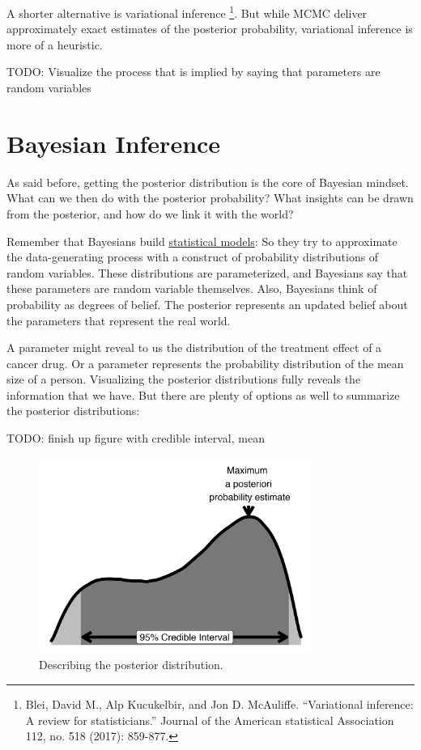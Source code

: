 \documentclass[
  10pt,
]{scrbook}
\begin{document}
A shorter alternative is variational inference \footnote{Blei, David M., Alp Kucukelbir, and Jon D. McAuliffe. ``Variational inference: A review for statisticians.'' Journal of the American statistical Association 112, no. 518 (2017): 859-877.}.
But while MCMC deliver approximately exact estimates of the posterior probability, variational inference is more of a heuristic.

TODO: Visualize the process that is implied by saying that parameters are random variables

\hypertarget{bayesian-inference}{%
\section{Bayesian Inference}\label{bayesian-inference}}

As said before, getting the posterior distribution is the core of Bayesian mindset.
What can we then do with the posterior probability?
What insights can be drawn from the posterior, and how do we link it with the world?

Remember that Bayesians build \protect\hyperlink{statistical-modeling}{statistical models}:
So they try to approximate the data-generating process with a construct of probability distributions of random variables.
These distributions are parameterized, and Bayesians say that these parameters are random variable themselves.
Also, Bayesians think of probability as degrees of belief.
The posterior represents an updated belief about the parameters that represent the real world.

A parameter might reveal to us the distribution of the treatment effect of a cancer drug.
Or a parameter represents the probability distribution of the mean size of a person.
Visualizing the posterior distributions fully reveals the information that we have.
But there are plenty of options as well to summarize the posterior distributions:

TODO: finish up figure with credible interval, mean

\begin{figure}

{\centering \includegraphics[width=0.8\textwidth]{figures/posteriori-1} 

}

\caption{Describing the posterior distribution.}\label{fig:posteriori}
\end{figure}
\end{document}

